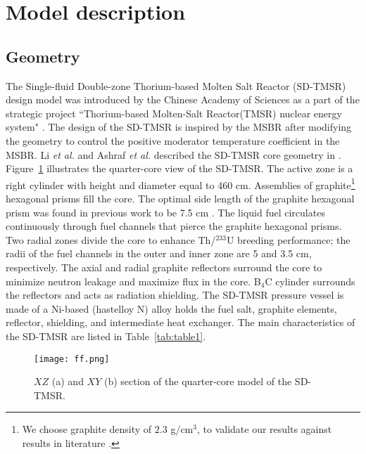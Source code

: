 \section{Model description} \label{Model-description}
\subsection{Geometry}
The Single-fluid Double-zone Thorium-based Molten Salt Reactor (SD-TMSR) design model was introduced by the Chinese Academy of Sciences as a part of  
the strategic project ``Thorium-based Molten-Salt Reactor(TMSR) nuclear energy system" 
\cite{jiang2012advanced,li2015analysis,li_optimization_2018}. The 
design of the \gls{SD-TMSR} is inspired by the \gls{MSBR} 
\cite{robertson_conceptual_1971} after modifying the geometry to 
control the positive moderator temperature coefficient in the MSBR. Li \emph{et al.} and Ashraf \emph{et al.} 
described the \gls{SD-TMSR} core 
geometry in \cite{li_optimization_2018,ashraf2019whole_core}. 
Figure~\ref{fig:ff} illustrates the quarter-core view of the 
\gls{SD-TMSR}.
The active zone is a right cylinder with height and diameter 
equal to 460 cm. Assemblies of graphite\footnote{We choose graphite density of 
$2.3$ g/cm$^3$, to validate our results against results in literature 
\cite{li_optimization_2018,nuttin2005potential}.} hexagonal prisms fill the 
core. The optimal side length of the graphite hexagonal prism was found in previous work to be 7.5 cm \cite{li_optimization_2018}. The liquid fuel circulates 
continuously through fuel channels that pierce the graphite hexagonal 
prisms. Two radial zones divide the core to enhance 
Th/$^{233}$U breeding performance; the radii of the fuel channels in the 
outer and inner zone are 5 and 3.5 cm, respectively. The axial and radial 
graphite reflectors surround the core to minimize neutron leakage and 
maximize flux in the core. B${_4}$C cylinder surrounds the reflectors and 
acts as radiation shielding. The \gls{SD-TMSR} pressure vessel is made of a Ni-based (hastelloy N) alloy holds 
the fuel salt, graphite elements, reflector, shielding, and intermediate heat exchanger. The main 
characteristics of the \gls{SD-TMSR} are listed in Table~\ref{tab:table1}.

\begin{figure} %
	\texttt{[image: ff.png]}
	\caption{$XZ$ (a) and $XY$ (b) section of the quarter-core model of the 
	SD-TMSR.}
	\label{fig:ff}
\end{figure}

